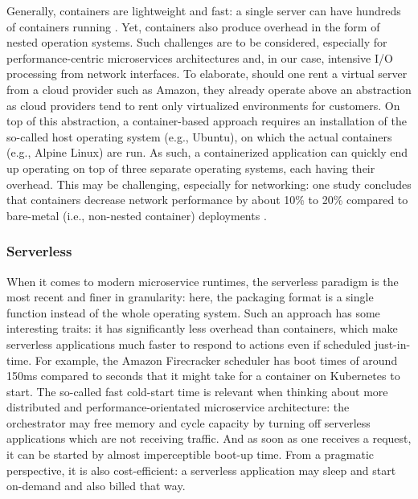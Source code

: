 \documentclass{IEEEtran}
\begin{document}
Generally, containers are lightweight and fast: a single server can have hundreds of containers running \cite{amaral2015performance}. Yet, containers also produce overhead in the form of nested operation systems. Such challenges are to be considered, especially for performance-centric microservices architectures and, in our case, intensive I/O processing from network interfaces. To elaborate, should one rent a virtual server from a cloud provider such as Amazon, they already operate above an abstraction as cloud providers tend to rent only virtualized environments for customers. On top of this abstraction, a container-based approach requires an installation of the so-called host operating system (e.g., Ubuntu), on which the actual containers (e.g., Alpine Linux) are run. As such, a containerized application can quickly end up operating on top of three separate operating systems, each having their overhead. This may be challenging, especially for networking: one study concludes that containers decrease network performance by about 10\% to 20\% compared to bare-metal (i.e., non-nested container) deployments \cite{kratzke2017microservices}.

\subsubsection{Serverless}

When it comes to modern microservice runtimes, the serverless paradigm is the most recent and finer in granularity: here, the packaging format is a single function instead of the whole operating system. Such an approach has some interesting traits: it has significantly less overhead than containers, which make serverless applications much faster to respond to actions even if scheduled just-in-time. For example, the Amazon Firecracker scheduler has boot times of around 150ms \cite{agache2020firecracker} compared to seconds that it might take for a container on Kubernetes to start. The so-called fast cold-start time is relevant when thinking about more distributed and performance-orientated microservice architecture: the orchestrator may free memory and cycle capacity by turning off serverless applications which are not receiving traffic. And as soon as one receives a request, it can be started by almost imperceptible boot-up time. From a pragmatic perspective, it is also cost-efficient: a serverless application may sleep and start on-demand and also billed that way.
\end{document}
